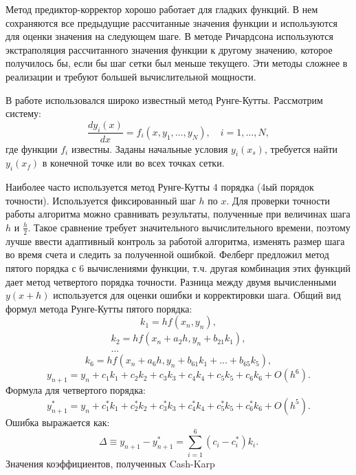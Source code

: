 Метод предиктор-корректор хорошо работает для гладких функций. В нем сохраняются все предыдущие рассчитанные значения функции и используются для оценки значения на следующем шаге. В методе Ричардсона используются экстраполяция рассчитанного значения функции к другому значению, которое получилось бы, если бы шаг сетки был меньше текущего. Эти методы сложнее в реализации и требуют большей вычислительной мощности.

В работе использовался широко известный метод Рунге-Кутты. Рассмотрим систему:
%
\begin{equation}
\frac{dy_i(x)}{dx}=f_i(x,y_1,\dots,y_N),\quad i=1,\dots,N,
\end{equation}
%
где функции $f_i$ известны. Заданы начальные условия $y_i(x_s)$, требуется найти $y_i(x_f)$ в конечной точке или во всех точках сетки.

Наиболее часто используется метод Рунге-Кутты 4 порядка (4ый порядок точности). Используется фиксированный шаг $h$ по $x$. Для проверки точности работы алгоритма можно сравнивать результаты, полученные при величинах шага $h$ и $\frac{h}{2}$. Такое сравнение требует значительного вычислительного времени, поэтому лучше ввести адаптивный контроль за работой алгоритма, изменять размер шага во время счета и следить за полученной ошибкой. Фелберг \cite{Numercial_recipes} предложил метод пятого порядка с 6 вычислениями функции, т.ч. другая комбинация этих функций дает метод четвертого порядка точности. Разница между двумя вычисленными $y(x+h)$ используется для оценки ошибки и корректировки шага. Общий вид формул метода Рунге-Кутты пятого порядка:
\begin{equation}
k_1=hf(x_n,y_n),
\end{equation}
\begin{equation}
\begin{split}
k_2=hf(x_n+a_2h,y_n+b_{21}k_1),\\
\dots
\end{split}
\end{equation}
\begin{equation}
k_6=hf(x_n+a_6h,y_n+b_{61}k_1+\dots+b_{65}k_5),
\end{equation}
\begin{equation}
y_{n+1}=y_n+c_1k_1+c_2k_2+c_3k_3+c_4k_4+c_5k_5+c_6k_6+O(h^6).
\end{equation}
Формула для четвертого порядка:
\begin{equation}
y_{n+1}^*=y_n+c_1^*k_1+c_2^*k_2+c_3^*k_3+c_4^*k_4+c_5^*k_5+c_6^*k_6+O(h^5).
\end{equation}
Ошибка выражается как:
\begin{equation}
\Delta\equiv y_{n+1}-y_{n+1}^*=\sum_{i=1}^6(c_i-c_i^*)k_i.
\end{equation}
Значения коэффициентов, полученных Cash-Karp \cite{Numercial_recipes}

